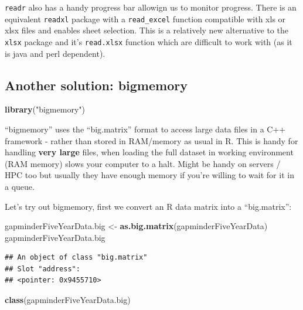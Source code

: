 \documentclass[]{article}
\newenvironment{Shaded}{\begin{snugshade}}{\end{snugshade}}
\newcommand{\KeywordTok}[1]{\textcolor[rgb]{0.13,0.29,0.53}{\textbf{{#1}}}}
\newcommand{\StringTok}[1]{\textcolor[rgb]{0.31,0.60,0.02}{{#1}}}
\newcommand{\NormalTok}[1]{{#1}}
\begin{document}
\texttt{readr} also has a handy progress bar allowign us to monitor
progress. There is an equivalent \texttt{readxl} package with a
\texttt{read\_excel} function compatible with xls or xlsx files and
enables sheet selection. This is a relatively new alternative to the
\texttt{xlsx} package and it's \texttt{read.xlsx} function which are
difficult to work with (as it is java and perl dependent).

\subsection{Another solution:
bigmemory}\label{another-solution-bigmemory}

\begin{Shaded}
\begin{Highlighting}[]
\KeywordTok{library}\NormalTok{(}\StringTok{"bigmemory"}\NormalTok{)}
\end{Highlighting}
\end{Shaded}

``bigmemory'' uses the ``big.matrix'' format to access large data files
in a C++ framework - rather than stored in RAM/memory as usual in R.
This is handy for handling \textbf{very large} files, when loading the
full dataset in working environment (RAM memory) slows your computer to
a halt. Might be handy on servers / HPC too but usually they have enough
memory if you're willing to wait for it in a queue.

Let's try out bigmemory, first we convert an R data matrix into a
``big.matrix'':

\begin{Shaded}
\begin{Highlighting}[]
\NormalTok{gapminderFiveYearData.big <-}\StringTok{ }\KeywordTok{as.big.matrix}\NormalTok{(gapminderFiveYearData)}
\NormalTok{gapminderFiveYearData.big}
\end{Highlighting}
\end{Shaded}

\begin{verbatim}
## An object of class "big.matrix"
## Slot "address":
## <pointer: 0x9455710>
\end{verbatim}

\begin{Shaded}
\begin{Highlighting}[]
\KeywordTok{class}\NormalTok{(gapminderFiveYearData.big)}
\end{Highlighting}
\end{Shaded}
\end{document}

